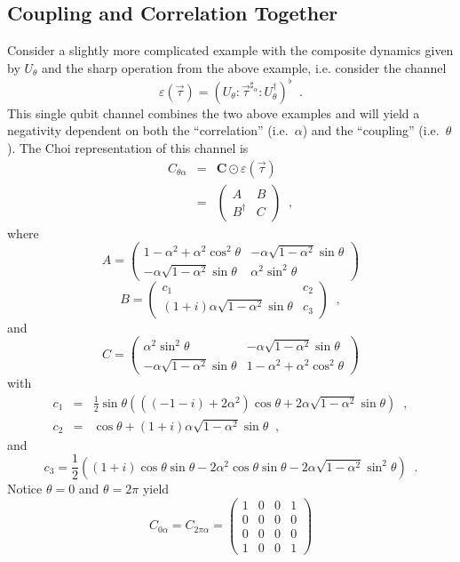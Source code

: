 \subsection{Coupling and Correlation Together}
Consider a slightly more complicated example with the composite dynamics given by $U_\theta$ and the sharp operation from the above example, i.e. consider the channel\
$$
\varepsilon(\vec{\tau}) = \left(U_\theta:\vec{\tau}^{\sharp_\alpha}:U_\theta^\dagger\right)^\flat\;\;.
$$
This single qubit channel combines the two above examples and will yield a negativity dependent on both the ``correlation'' (i.e.\ $\alpha$) and the ``coupling'' (i.e.\ $\theta$).  The Choi representation of this channel is
\begin{eqnarray*}
C_{\theta\alpha} &=& \mathbf{C}\odot \varepsilon(\vec{\tau})\\
 &=& \begin{pmatrix}
 A & B \\
 B^\dagger & C 
\end{pmatrix}\;\;,
\end{eqnarray*}
where 
$$
A = \begin{pmatrix}
 1-\alpha^2+\alpha^2 \cos^2\theta & -\alpha \sqrt{1-\alpha^2} \sin\theta\\
  -\alpha \sqrt{1-\alpha^2} \sin\theta & \alpha^2 \sin^2\theta 
\end{pmatrix}
$$
$$
B = \begin{pmatrix}
c_1 & c_2 \\
(1+i) \alpha \sqrt{1-\alpha^2} \sin\theta & c_3 
\end{pmatrix}\;\;,
$$
and
$$
C = \begin{pmatrix}
 \alpha^2 \sin^2\theta & -\alpha \sqrt{1-\alpha^2} \sin\theta \\
 -\alpha \sqrt{1-\alpha^2} \sin\theta & 1-\alpha^2+\alpha^2 \cos^2\theta
\end{pmatrix}
$$
with
\begin{eqnarray*}
c_1 &=& \frac{1}{2} \sin\theta \left(\left((-1-i)+2 \alpha^2\right) \cos\theta+2 \alpha \sqrt{1-\alpha^2} \sin\theta\right)\;\;,\\
c_2 &=& \cos\theta+(1+i) \alpha \sqrt{1-\alpha^2} \sin\theta\;\;,
\end{eqnarray*}
and
$$
c_3 = \frac{1}{2} \left((1+i) \cos\theta \sin\theta-2 \alpha^2 \cos\theta \sin\theta-2 \alpha \sqrt{1-\alpha^2} \sin^2\theta\right)\;\;.
$$
Notice $\theta=0$ and $\theta=2\pi$ yield
$$
C_{0\alpha} = C_{2\pi\alpha} = \begin{pmatrix}
 1&0&0&1\\
 0&0&0&0\\
 0&0&0&0\\
 1&0&0&1
\end{pmatrix}
$$  
